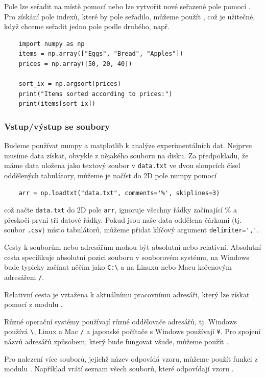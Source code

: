 Pole lze seřadit na místě pomocí  nebo lze vytvořit nové seřazené pole pomocí . Pro získání pole indexů, které by pole seřadilo, můžeme použít , což je užitečné, když chceme seřadit jedno pole podle druhého, např.
\begin{lstlisting}
    import numpy as np
    items = np.array(["Eggs", "Bread", "Apples"])
    prices = np.array([50, 20, 40])

    sort_ix = np.argsort(prices)
    print("Items sorted according to prices:")
    print(items[sort_ix])
\end{lstlisting}

\subsubsection{Vstup/výstup se soubory}
Budeme používat numpy a matplotlib k analýze experimentálních dat. Nejprve musíme data získat, obvykle z nějakého souboru na disku. Za předpokladu, že máme data uložena jako textový soubor v \verb|data.txt| ve dvou sloupcích čísel oddělených tabulátory, můžeme je načíst do 2D pole numpy pomocí
\begin{lstlisting}
    arr = np.loadtxt("data.txt", comments='%', skiplines=3)
\end{lstlisting}
což načte \verb|data.txt| do 2D pole \verb|arr|, ignoruje všechny řádky začínající \% a přeskočí první tři datové řádky. Pokud jsou naše data oddělena čárkami (tj. soubor \verb|.csv|) místo tabulátorů, můžeme přidat klíčový argument \verb|delimiter=','|.

\begin{syntax}[Paths]
    Cesty k souborům nebo adresářům mohou být absolutní nebo relativní. Absolutní cesta specifikuje absolutní pozici souboru v souborovém systému, na Windows bude typicky začínat něčím jako \verb|C:\| a na Linuxu nebo Macu kořenovým adresářem \verb|/|.

    Relativní cesta je vztažena k aktuálnímu pracovnímu adresáři, který lze získat pomocí  z modulu .

    Různé operační systémy používají různé oddělovače adresářů, tj. Windows používá \verb|\|, Linux a Mac \verb|/| a japonské počítače s Windows používají \verb|¥|. Pro spojení názvů adresářů způsobem, který bude fungovat všude, můžeme použít .

    Pro nalezení více souborů, jejichž název odpovídá vzoru, můžeme použít funkci  z modulu . Například  vrátí seznam všech souborů, které odpovídají vzoru .
\end{syntax}

